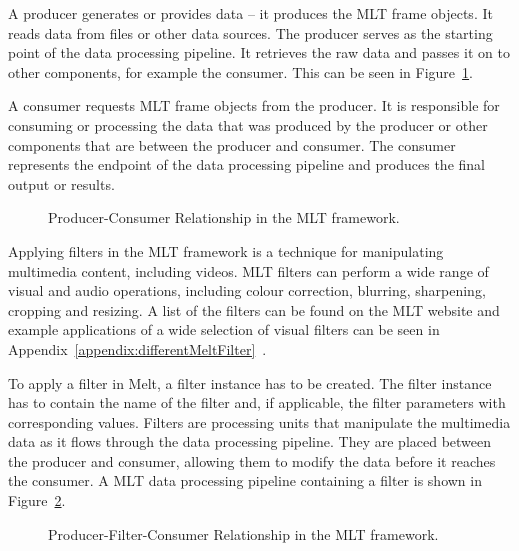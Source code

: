 \documentclass[../MasterThesis.tex]{subfiles}
\begin{document}
A producer generates or provides data -- it produces the MLT frame objects. 
It reads data from files or other data sources. The producer serves as the starting point of the data processing pipeline. It retrieves the raw data and passes it on to other components, for example the consumer. This can be seen in Figure~\ref{fig:producer_consumer}.

A consumer requests MLT frame objects from the producer.
It is responsible for consuming or processing the data that was produced by the producer or other components that are between the producer and consumer. 
The consumer represents the endpoint of the data processing pipeline and produces the final output or results.



\begin{figure}[H]
	\centering
	\caption{Producer-Consumer Relationship in the MLT framework.}
	\label{fig:producer_consumer}
\end{figure}

Applying filters in the MLT framework is a technique for manipulating multimedia content, including videos. 
MLT filters can perform a wide range of visual and audio operations, including colour correction, blurring, sharpening, cropping and resizing. A list of the filters can be found on the MLT website and example applications of a wide selection of visual filters can be seen in Appendix~\ref{appendix:differentMeltFilter}~\cite{melt_filters}.


To apply a filter in Melt, a filter instance has to be created. The filter instance has to contain the name of the filter and, if applicable, the filter parameters with corresponding values.
Filters are processing units that manipulate the multimedia data as it flows through the data processing pipeline. They are placed between the producer and consumer, allowing them to modify the data before it reaches the consumer. A MLT data processing pipeline containing a filter is shown in Figure~\ref{fig:producer_filter_consumer}.



\begin{figure}[H]
	\centering
	\caption{Producer-Filter-Consumer Relationship in the MLT framework.}
	\label{fig:producer_filter_consumer}
\end{figure}
\end{document}
